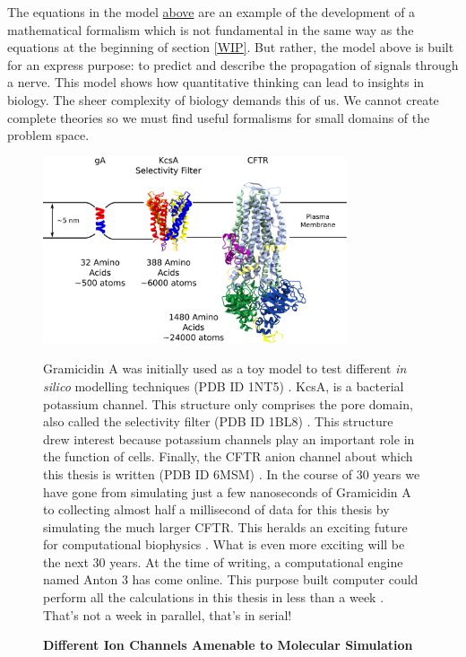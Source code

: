 The equations in the model \href{hh_equations}{above} are an example of the development of a mathematical formalism which is not fundamental in the same way as the equations at the beginning of section \ref{WIP}. But rather, the model above is built for an express purpose: to predict and describe the propagation of signals through a nerve. This model shows how quantitative thinking can lead to insights in biology. The sheer complexity of biology demands this of us. We cannot create complete theories so we must find useful formalisms for small domains of the problem space.

\begin{figure}
	\begin{center}
		\includegraphics[width=0.8\textwidth]{figures/ion_channel_progression.pdf}
	\end{center}
	\captionsetup{singlelinecheck = false, justification=raggedright}
	\caption[Different Ion Channels Amenable to Molecular Simulation] {\textbf{Different Ion Channels Amenable to Molecular Simulation}}{Gramicidin A was initially used as a toy model to test different \textit{in silico} modelling techniques (PDB ID 1NT5) \cite{sham2003}. KcsA, is a bacterial potassium channel. This structure only comprises the pore domain, also called the selectivity filter (PDB ID 1BL8) \cite{doyle1998}. This structure drew interest because potassium channels play an important role in the function of cells. Finally, the CFTR anion channel about which this thesis is written (PDB ID 6MSM) \cite{zhang2018a}. In the course of 30 years we have gone from simulating just a few nanoseconds of Gramicidin A to collecting almost half a millisecond of data for this thesis by simulating the much larger CFTR. This heralds an exciting future for computational biophysics \cite{roux1993}. What is even more exciting will be the next 30 years. At the time of writing, a computational engine named Anton 3 has come online. This purpose built computer could perform all the calculations in this thesis in less than a week \cite{jones2022, russell2021}. That's not a week in parallel, that's in serial!}
	\label{ion_channel_progress}
\end{figure}

